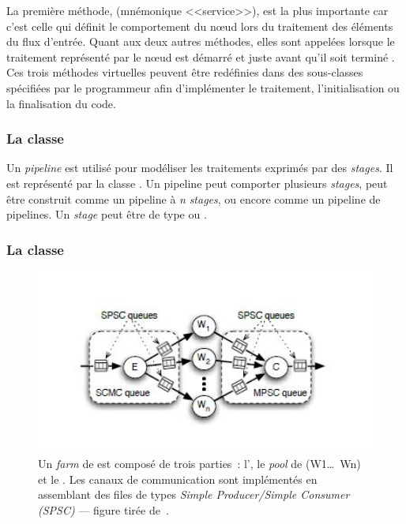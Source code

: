 La premi\`ere m\'ethode,  (mn\'emonique <<service>>), est la plus importante car c'est celle qui d\'efinit le comportement du nœud lors du traitement des \'el\'ements du flux d'entr\'ee. Quant aux deux autres m\'ethodes, elles sont appel\'ees lorsque le traitement repr\'esent\'e par le nœud est d\'emarr\'e  et juste avant qu'il soit termin\'e . Ces trois m\'ethodes virtuelles peuvent \^etre red\'efinies dans des sous-classes  sp\'ecifi\'ees par le programmeur afin d'impl\'ementer le traitement, l'initialisation ou la finalisation du code.


\subsubsection*{La classe }

Un \emph{pipeline} est utilis\'e pour mod\'eliser les traitements exprim\'es par des \emph{stages}. Il est repr\'esent\'e par la classe . Un {pipeline} peut comporter plusieurs \emph{stages}, peut \^etre construit comme un pipeline \`a \emph{n} \emph{stages}, ou encore comme un {pipeline} de {pipelines}. Un \emph{stage} peut \^etre de type  ou .


\goodbreak

\subsubsection*{La classe }
\label{farm.sect}

\begin{figure}	%
     \centering
     \includegraphics[width=1.0\textwidth]{Figures/FastFlowFarm.jpg}
      \caption[Les trois parties d'un \emph{farm} de .]{Un \emph{farm} de  est compos\'e de trois parties~:  l', le \emph{pool} de  (W1\ldots\ Wn) et le . Les canaux de communication sont impl\'ement\'es en assemblant des files de types \emph{Simple Producer/Simple Consumer (SPSC)} --- figure tir\'ee de~\citep{aldinucci2010efficient}.}
       \label{FastFlowFarm.fig}
\end{figure}

